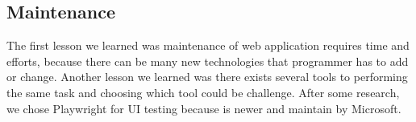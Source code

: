 \subsection{Maintenance}

The first lesson we learned was maintenance of web application requires time and efforts, because there can be many new technologies that programmer has to add or change. 
Another lesson we learned was there exists several tools to performing the same task and choosing which tool could be challenge. 
After some research, we chose Playwright for UI testing because is newer and maintain by Microsoft.



